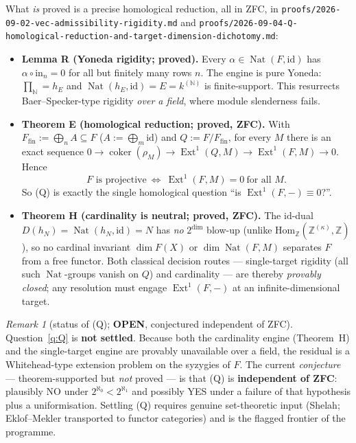 \documentclass[11pt]{article}
\theoremstyle{plain}
\theoremstyle{definition}
\theoremstyle{remark}
\newtheorem{remark}{Remark}
\newcommand{\Hom}{\mathrm{Hom}}
\DeclareMathOperator{\Nat}{Nat}
\DeclareMathOperator{\Ext}{Ext}
\DeclareMathOperator{\coker}{coker}
\DeclareMathOperator{\dm}{dim}
\begin{document}
What \emph{is} proved is a precise homological reduction, all in ZFC, in
\texttt{proofs/2026-09-02-vec-admissibility-rigidity.md} and
\texttt{proofs/2026-09-04-Q-homological-reduction-and-target-dimension-dichotomy.md}:
\begin{itemize}
\item \textbf{Lemma R (Yoneda rigidity; proved).} Every $\alpha\in\Nat(F,\mathrm{id})$ has
$\alpha\circ\mathrm{in}_n=0$ for all but finitely many rows $n$. The engine is pure Yoneda:
$\prod_{\mathbb N}=h_E$ and $\Nat(h_E,\mathrm{id})=E=k^{(\mathbb N)}$ is finite-support. This
resurrects Baer--Specker-type rigidity \emph{over a field}, where module slenderness fails.
\item \textbf{Theorem E (homological reduction; proved, ZFC).} With $F_{\mathrm{fin}}:=\bigoplus_n
A\subseteq F$ ($A:=\bigoplus_m\mathrm{id}$) and $Q:=F/F_{\mathrm{fin}}$, for every $M$ there is an
exact sequence $0\to\coker(\rho_M)\to\Ext^1(Q,M)\to\Ext^1(F,M)\to0$. Hence
\[
   F\text{ is projective}\ \Longleftrightarrow\ \Ext^1(F,M)=0\ \text{for all }M.
\]
So (Q) is exactly the single homological question ``is $\Ext^1(F,-)\equiv0$?''.
\item \textbf{Theorem H (cardinality is neutral; proved, ZFC).} The $\mathrm{id}$-dual
$D(h_N)=\Nat(h_N,\mathrm{id})=N$ has \emph{no} $2^{\dm}$ blow-up (unlike
$\Hom_{\mathbb Z}(\mathbb Z^{(\kappa)},\mathbb Z)$), so no cardinal invariant $\dm F(X)$ or
$\dm\Nat(F,M)$ separates $F$ from a free functor. Both classical decision routes --- single-target
rigidity (all such $\Nat$-groups vanish on $Q$) and cardinality --- are thereby \emph{provably
closed}; any resolution must engage $\Ext^1(F,-)$ at an infinite-dimensional target.
\end{itemize}

\begin{remark}[status of (Q); \textbf{OPEN}, conjectured independent of ZFC]
Question~\ref{q:Q} is \textbf{not settled}. Because both the cardinality engine (Theorem~H) and the
single-target engine are provably unavailable over a field, the residual is a Whitehead-type
extension problem on the syzygies of $F$. The current \emph{conjecture} --- theorem-supported but
\emph{not} proved --- is that (Q) is \textbf{independent of ZFC}: plausibly NO under
$2^{\aleph_0}<2^{\aleph_1}$ and possibly YES under a failure of that hypothesis plus a
uniformisation. Settling (Q) requires genuine set-theoretic input (Shelah; Eklof--Mekler transported
to functor categories) and is the flagged frontier of the programme.
\end{remark}
\end{document}
